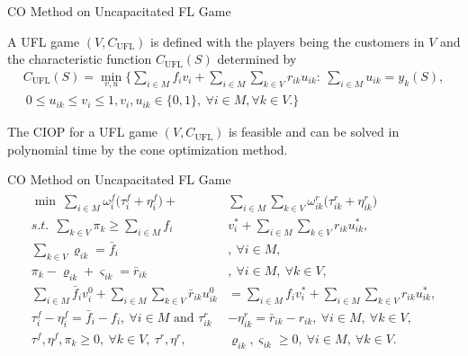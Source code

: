 \documentclass[14pt]{beamer}
\begin{document}
\begin{frame}{CO Method on Uncapacitated FL Game}
\small
\begin{definition}\label{defi:tmp}
\justifying
A UFL game $(V,C_{\mathrm{UFL}})$ is defined with the players being the customers in $V$ and the characteristic function  $C_{\mathrm{UFL}}(S)$ determined by 
\begin{eqnarray*}\label{eqn:colp2}
C_{\mathrm{UFL}}(S) = \min_{v,u} \bigg\{\sum_{i \in M} f_iv_i + \sum_{i \in M} \sum_{k \in V} r_{ik}u_{ik}:~\sum_{i \in M} u_{ik} = y_k(S), \\
~0 \leq u_{ik} \leq v_i \leq 1, v_i, u_{ik} \in \{0,1\}, ~\forall i \in M, \forall k \in V.
\bigg\}
\end{eqnarray*}
\end{definition}
\begin{lemma}\label{lemma:wmpfeasible}
\justifying
The CIOP for a UFL game $(V,C_{\mathrm{UFL}})$ is feasible and can be solved in polynomial time by the cone optimization method.
\end{lemma}
\end{frame}


\begin{frame}{CO Method on Uncapacitated FL Game}
\small
\vspace{-3mm}
\begin{eqnarray*}
\begin{aligned}
\min~ \sum_{i \in M} \omega_i^f \big(\tau_i^f+\eta_i^f\big) + &\sum_{i \in M}\sum_{k \in V}\omega_{ik}^r \big(\tau_{ik}^r+\eta_{ik}^r\big)\\
s.t.~~\sum_{k \in V}\pi_k \geq \sum_{i \in M} f_i&v^*_i + \sum_{i \in M}\sum_{k \in V} r_{ik}u^*_{ik},\\
\sum_{k \in V} \varrho_{ik} = \bar{f}_i&, ~\forall i \in M,\\
\pi_k - \varrho_{ik} + \varsigma_{ik}= \bar{r}_{ik}&,~\forall i \in M, ~\forall k \in V,\\
\sum_{i \in M} \bar{f}_iv^0_i + \sum_{i \in M}\sum_{k \in V} \bar{r}_{ik}u^0_{ik} &= \sum_{i \in M} f_iv^*_i + \sum_{i \in M}\sum_{k \in V} r_{ik}u^*_{ik},\\
\tau_i^f -\eta_i^f = \bar{f}_i - f_i,~\forall i \in M \mbox{ and } \tau_{ik}^r& - \eta_{ik}^r= \bar{r}_{ik} - r_{ik},~\forall i \in M,~\forall k \in V,\\
\tau^f,\eta^f,\pi_k \geq 0,~\forall k \in V,~\tau^r,\eta^r,&\varrho_{ik},\varsigma_{ik} \geq 0,~\forall i \in M,~\forall k \in V.
\end{aligned}
\end{eqnarray*}
\end{frame}
\end{document}
